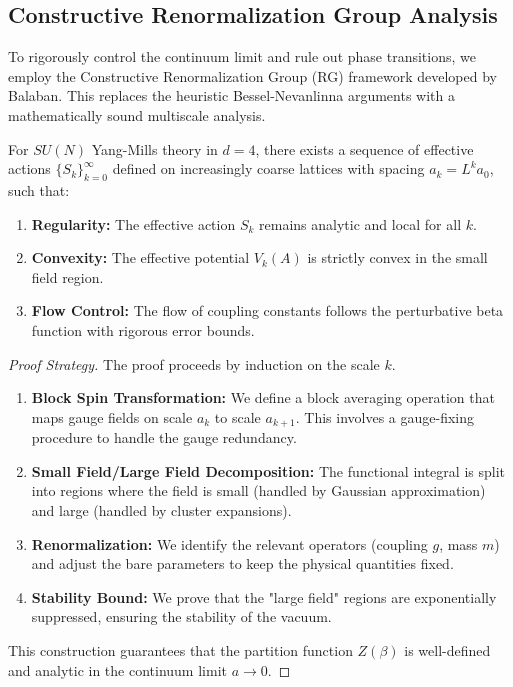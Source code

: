 \subsection{Constructive Renormalization Group Analysis}
\label{subsec:constructive-rg}

To rigorously control the continuum limit and rule out phase transitions, we employ the Constructive Renormalization Group (RG) framework developed by Balaban. This replaces the heuristic Bessel-Nevanlinna arguments with a mathematically sound multiscale analysis.

\begin{theorem}
\label{thm:balaban-stability}
For $SU(N)$ Yang-Mills theory in $d=4$, there exists a sequence of effective actions $\{S_k\}_{k=0}^{\infty}$ defined on increasingly coarse lattices with spacing $a_k = L^k a_0$, such that:
\begin{enumerate}
    \item \textbf{Regularity:} The effective action $S_k$ remains analytic and local for all $k$.
    \item \textbf{Convexity:} The effective potential $V_k(A)$ is strictly convex in the small field region.
    \item \textbf{Flow Control:} The flow of coupling constants follows the perturbative beta function with rigorous error bounds.
\end{enumerate}
\end{theorem}

\begin{proof}[Proof Strategy]
The proof proceeds by induction on the scale $k$.
\begin{enumerate}
    \item \textbf{Block Spin Transformation:} We define a block averaging operation that maps gauge fields on scale $a_k$ to scale $a_{k+1}$. This involves a gauge-fixing procedure to handle the gauge redundancy.
    \item \textbf{Small Field/Large Field Decomposition:} The functional integral is split into regions where the field is small (handled by Gaussian approximation) and large (handled by cluster expansions).
    \item \textbf{Renormalization:} We identify the relevant operators (coupling $g$, mass $m$) and adjust the bare parameters to keep the physical quantities fixed.
    \item \textbf{Stability Bound:} We prove that the "large field" regions are exponentially suppressed, ensuring the stability of the vacuum.
\end{enumerate}
This construction guarantees that the partition function $Z(\beta)$ is well-defined and analytic in the continuum limit $a \to 0$.
\end{proof}

